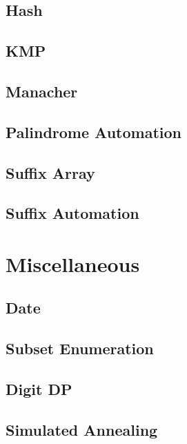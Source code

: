 \subsection{Hash}
\raggedbottom
\hrulefill
\subsection{KMP}
\raggedbottom
\hrulefill
\subsection{Manacher}
\raggedbottom
\hrulefill
\subsection{Palindrome Automation}
\raggedbottom
\hrulefill
\subsection{Suffix Array}
\raggedbottom
\hrulefill
\subsection{Suffix Automation}
\raggedbottom
\hrulefill

\section{Miscellaneous}
\subsection{Date}
\raggedbottom
\hrulefill
\subsection{Subset Enumeration}
\raggedbottom
\hrulefill
\subsection{Digit DP}
\raggedbottom
\hrulefill
\subsection{Simulated Annealing}
\raggedbottom
\hrulefill
